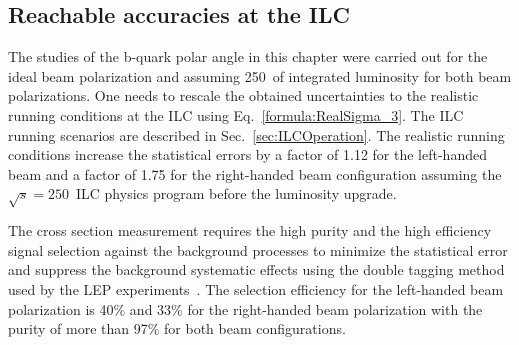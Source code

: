\subsection{Reachable accuracies at the ILC}

The studies of the b-quark polar angle in this chapter were carried out for the ideal beam polarization and assuming 250\ifb\ of integrated luminosity for both beam polarizations.
One needs to rescale the obtained uncertainties to the realistic running conditions at the ILC using Eq.~\ref{formula:RealSigma_3}.
The ILC running scenarios are described in Sec.~\ref{sec:ILCOperation}. %
The realistic running conditions increase the statistical errors by a factor of 1.12 for the left-handed beam and a factor of 1.75 for the right-handed beam configuration assuming the $\sqrt{s} = 250$\gev\ ILC physics program before the luminosity upgrade. 


The cross section measurement requires the high purity and the high efficiency signal selection against the background processes to minimize the statistical error and suppress the background systematic effects using the double tagging method used by the LEP experiments~\cite{bib:steinberger}. 
The selection efficiency for the left-handed beam polarization is 40\% and 33\% for the right-handed beam polarization with the purity of more than 97\% for both beam configurations. 

